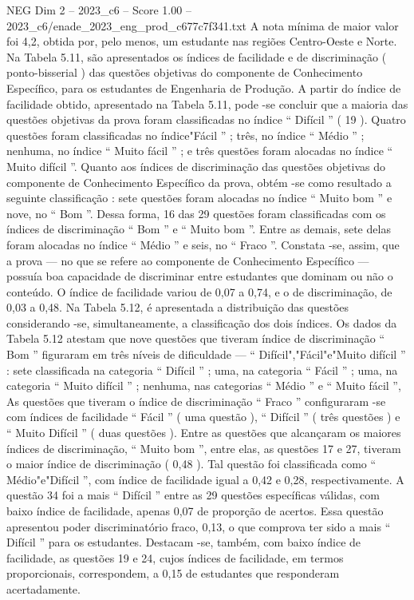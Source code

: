 \begin{textsample}{NEG Dim 2 – 2023\_c6 – Score 1.00 – 2023\_c6/enade\_2023\_eng\_prod\_c677c7f341.txt}
A nota mínima de maior valor foi 4,2, obtida por, pelo menos, um estudante nas regiões Centro-Oeste e Norte.
Na Tabela 5.11, são apresentados os índices de facilidade e de discriminação ( ponto-bisserial ) das questões objetivas do componente de Conhecimento Específico, para os estudantes de Engenharia de Produção.
A partir do índice de facilidade obtido, apresentado na Tabela 5.11, pode -se concluir que a maioria das questões objetivas da prova foram classificadas no índice “ Difícil ” ( 19 ).
Quatro questões foram classificadas no índice"Fácil ” ; três, no índice “ Médio ” ; nenhuma, no índice “ Muito fácil ” ; e três questões foram alocadas no índice “ Muito difícil ”.
Quanto aos índices de discriminação das questões objetivas do componente de Conhecimento Específico da prova, obtém -se como resultado a seguinte classificação : sete questões foram alocadas no índice “ Muito bom ” e nove, no “ Bom ”.
Dessa forma, 16 das 29 questões foram classificadas com os índices de discriminação “ Bom ” e “ Muito bom ”.
Entre as demais, sete delas foram alocadas no índice “ Médio ” e seis, no “ Fraco ”.
Constata -se, assim, que a prova — no que se refere ao componente de Conhecimento Específico — possuía boa capacidade de discriminar entre estudantes que dominam ou não o conteúdo.
O índice de facilidade variou de 0,07 a 0,74, e o de discriminação, de 0,03 a 0,48.
Na Tabela 5.12, é apresentada a distribuição das questões considerando -se, simultaneamente, a classificação dos dois índices.
Os dados da Tabela 5.12 atestam que nove questões que tiveram índice de discriminação “ Bom ” figuraram em três níveis de dificuldade — “ Difícil","Fácil"e"Muito difícil ” : sete classificada na categoria “ Difícil ” ; uma, na categoria “ Fácil ” ; uma, na categoria “ Muito difícil ” ; nenhuma, nas categorias “ Médio ” e “ Muito fácil ”, As questões que tiveram o índice de discriminação “ Fraco ” configuraram -se com índices de facilidade “ Fácil ” ( uma questão ), “ Difícil ” ( três questões ) e “ Muito Difícil ” ( duas questões ).
Entre as questões que alcançaram os maiores índices de discriminação, “ Muito bom ”, entre elas, as questões 17 e 27, tiveram o maior índice de discriminação ( 0,48 ).
Tal questão foi classificada como “ Médio"e"Difícil ”, com índice de facilidade igual a 0,42 e 0,28, respectivamente.
A questão 34 foi a mais “ Difícil ” entre as 29 questões específicas válidas, com baixo índice de facilidade, apenas 0,07 de proporção de acertos.
Essa questão apresentou poder discriminatório fraco, 0,13, o que comprova ter sido a mais “ Difícil ” para os estudantes.
Destacam -se, também, com baixo índice de facilidade, as questões 19 e 24, cujos índices de facilidade, em termos proporcionais, correspondem, a 0,15 de estudantes que responderam acertadamente.

\end{textsample}

